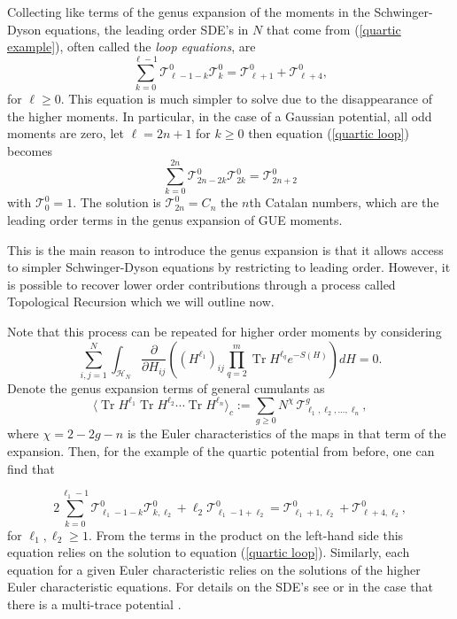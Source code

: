 \documentclass[10pt]{article}
\DeclareMathOperator{\tr}{Tr}
\begin{document}
\begin{appendices}
	Collecting like terms of the genus expansion of the moments in the Schwinger-Dyson equations, the leading order SDE's in $N$ that come from (\ref{quartic example}), often called the \textit{loop equations},   are
	\begin{equation}\label{quartic loop}
		\sum_{k=0}^{\ell-1}\mathcal{T}_{\ell-1-k}^{0} \mathcal{T}^{0}_{k} = \mathcal{T}^{0}_{\ell+1}  + \mathcal{T}^{0}_{\ell+4},
	\end{equation}
	for $\ell \geq 0$.
	This equation is much simpler to solve due to the disappearance of the higher moments. In particular, in the case of a Gaussian potential, all odd moments are zero, let $\ell = 2n +1$  for $k\geq 0$ then equation (\ref{quartic loop}) becomes
	\begin{equation*}
		\sum_{k=0}^{2n}\mathcal{T}_{2n-2k}^{0} \mathcal{T}^{0}_{2k} = \mathcal{T}^{0}_{2n+2} 
	\end{equation*} with $\mathcal{T}^{0}_{0} =1$. The solution is $\mathcal{T}^{0}_{2n} = C_{n}$ the $n$th Catalan numbers, which are the leading order terms in the genus expansion  of GUE moments.
	
	This is the main reason to introduce the genus expansion is that it allows access to simpler Schwinger-Dyson equations by restricting to leading order. However, it is  possible to recover lower order contributions through a process called Topological Recursion which we will outline now.
	
	Note that this process can be repeated for higher order moments by considering
	\begin{equation*}
		\sum_{i,j=1}^{N}	\int_{\mathcal{H}_{N}} \frac{\partial}{\partial H_{ij}}\left( (H^{\ell_{1}})_{ij} \prod_{q=2}^{m}\tr H^{\ell_{q}} e^{-S(H)}\right)dH =0.
	\end{equation*}
	Denote the genus expansion terms of general cumulants as 
	\begin{equation*}
		\langle \tr H^{\ell_{1}}\tr H^{\ell_{2}}\cdots \tr H^{\ell_{n}}\rangle_{c} := \sum_{g \geq 0} N^{\chi}\, \mathcal{T}^{g}_{\ell_{1},\ell_{2},...,\ell_{n}},
	\end{equation*}
	where $\chi = 2-2g-n$ is the Euler characteristics of the maps in that term of the expansion. Then, for the example of the quartic potential from before, one can find that 
	
	\begin{equation*}
		2\sum_{k=0}^{\ell_{1}-1}\mathcal{T}_{\ell_{1}-1-k}^{0} \mathcal{T}^{0}_{k,\ell_{2}} +\ell_{2} \mathcal{T}^{0}_{\ell_{1}-1+\ell_{2}} = \mathcal{T}^{0}_{\ell_{1}+1,\ell_{2}}  + \mathcal{T}^{0}_{\ell+4,\ell_{2}},
	\end{equation*}
	for $\ell_{1},\ell_{2}\geq 1$. From the terms in the product on the left-hand side this equation relies on the solution to equation (\ref{quartic loop}). Similarly,  each equation for a given Euler characteristic relies on the solutions of the higher Euler characteristic equations. For details on the SDE's see \cite{Random Matrices,Eynard2018} or in the case that there is a multi-trace potential \cite{blobbed1,AK,HKP 2}.
	

\end{appendices}
\end{document}
